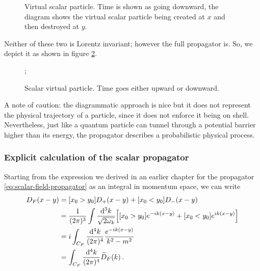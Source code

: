 \documentclass[main.tex]{subfiles}
\begin{document}
\begin{figure}[ht]
\centering
{}
\caption{Virtual scalar particle. Time is shown as going downward, the diagram shows the virtual scalar particle being created at \(x\) and then destroyed at \(y\).}
\label{fig:virtual-scalar-particle-diagram-2}
\end{figure}

Neither of these two is Lorentz invariant; however the full propagator is. So, we depict it as shown in figure \ref{fig:virtual-scalar-particle-diagram}.

\begin{figure}[ht]
\centering
{};
\caption{Scalar virtual particle. Time goes either upward or downward.}
\label{fig:virtual-scalar-particle-diagram}
\end{figure}


A note of caution: the diagrammatic approach is nice but it does not represent the physical trajectory of a particle, since it does not enforce it being on shell. 
Nevertheless, just like a quantum particle can tunnel through a potential barrier higher than its energy, the propagator describes a probabilistic physical process.

\subsubsection{Explicit calculation of the scalar propagator}

Starting from the expression we derived in an earlier chapter for the propagator \eqref{eq:scalar-field-propagator} as an integral in momentum space, we can write 
%
\begin{align}
D_F (x-y) &= [x_0 > y_0 ] D_+ (x-y) + [x_0 < y_0 ] D_- (x-y)  \\
&= \frac{1}{(2 \pi )^3} \int \frac{ \dd[3]{k}}{\sqrt{2 \omega_{k}}}
\qty[[x_0 > y_0 ] e^{-ik(x-y)} + [x_0 < y_0 ] e^{ik(x-y)}]  \\
&= i \int_{C_F} \frac{ \dd[4]{k}}{(2 \pi )^{4}}\frac{e^{-ik(x-y)}}{k^2-m^2}\\
&= \int_{C_F} \frac{ \dd[4]{k}}{(2 \pi )^{4}} \widetilde{D}_{F} (k)
\,.
\end{align}
\end{document}
